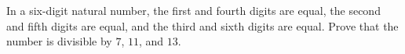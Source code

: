 In a six-digit natural number, the first and fourth digits are equal, the second and fifth digits are equal, and the third and sixth digits are equal. Prove that the number is divisible by $7$, $11$, and $13$.
